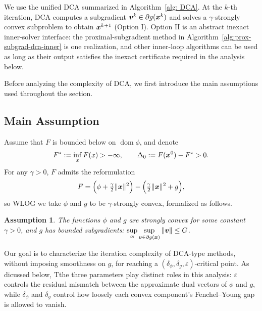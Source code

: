 \documentclass[english]{article}
\newtheorem{assumption}{Assumption}[section]
\begin{document}
We use the unified DCA summarized in Algorithm~\ref{alg: DCA}. At the
$k$-th iteration, DCA computes a subgradient $\bm{v}^k \in \partial g(\bm{x}^k)$
and solves a $\gamma$-strongly convex subproblem to obtain $\bm{x}^{k+1}$
(Option I). Option II is an abstract inexact inner-solver interface:
the proximal-subgradient method in
Algorithm~\ref{alg:prox-subgrad-dca-inner} is one realization, and other
inner-loop algorithms can be used as long as their output satisfies the
inexact certificate required in the analysis below.

Before analyzing the complexity of DCA, we first introduce the main
assumptions used throughout the section.

\subsection{Main Assumption}
Assume that $F$ is bounded below on $\operatorname{dom}\phi$, and denote
\[
F^\star:=\inf\limits_x F(x)>-\infty,
\qquad
\Delta_0:=F(\bm{x}^0)-F^\star > 0.
\]
For any $\gamma>0$, $F$ admits the reformulation
\[
F = \Big(\phi+\tfrac{\gamma}{2}\|\bm{x}\|^2\Big) - \Big(\tfrac{\gamma}{2}\|\bm{x}\|^2+g\Big),
\]
so WLOG we take $\phi$ and $g$ to be $\gamma$-strongly convex, formalized as follows.

\begin{assumption}
\label{ass:strong-convexity-dc}
The functions $\phi$ and $g$ are strongly convex for some constant
$\gamma>0$, and $g$ has bounded subgradients:
$\sup\limits_{\bm{x}}\sup\limits_{\bm{v}\in\partial g(\bm{x})}\|\bm{v}\|\le G$.
\end{assumption}

Our goal is to characterize the iteration complexity of DCA-type methods, without imposing smoothness on $g$, for reaching a $(\delta_\phi,\delta_g,\varepsilon)$-critical
point. As dicussed below, Tthe three parameters play distinct roles in this analysis:
$\varepsilon$ controls the residual mismatch between the approximate dual
vectors of $\phi$ and $g$, while $\delta_\phi$ and $\delta_g$ control how
loosely each convex component's Fenchel--Young gap is allowed to vanish.
\end{document}

